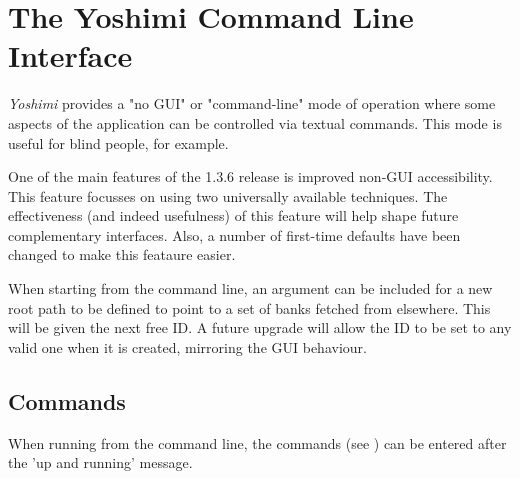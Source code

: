 %
%
%

\section{The Yoshimi Command Line Interface}
\label{sec:command_line}

   \textsl{Yoshimi} provides a "no GUI" or "command-line" mode of operation
   where some aspects of the application can be controlled via textual commands.
   This mode is useful for blind people, for example.

   One of the main features of the 1.3.6 release is improved non-GUI
   accessibility.  This feature focusses on using two universally available
   techniques. The effectiveness (and indeed usefulness) of this feature
   will help shape future complementary interfaces. Also, a number of
   first-time defaults have been changed to make this feataure easier.

   When starting from the command line, an argument can be included for a new
   root path to be defined to point to a set of banks fetched from elsewhere.
   This will be given the next free ID. A future upgrade will allow the ID to
   be set to any valid one when it is created, mirroring the GUI behaviour.

\subsection{Commands}
\label{subsec:command_line_commands}

   When running from the command line, the commands
   (see )
   can be entered after the 'up and running' message.

